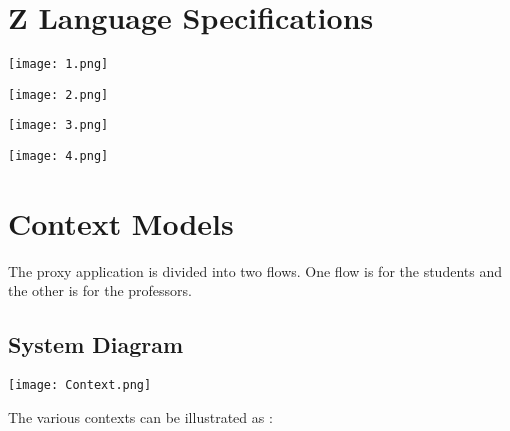 \documentclass[paper=a4, fontsize=15pt]{scrartcl}
\begin{document}
\section{Z Language Specifications}


\begin{center}
\texttt{[image: 1.png]}
\end{center}

\begin{center}
\texttt{[image: 2.png]}
\end{center}

\begin{center}
\texttt{[image: 3.png]}
\end{center}

\begin{center}
\texttt{[image: 4.png]}
\end{center}

 \newpage
\section{Context Models}

The proxy application is divided into two flows. One flow is for the students and the other is for the professors. 


\begin{center}
\subsection{{\Large System Diagram}}
\texttt{[image: Context.png]}
\end{center}

The various contexts can be illustrated as :
\end{document}
